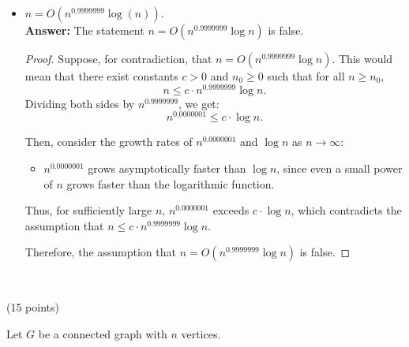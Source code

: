 \documentclass[12pt]{article}
\theoremstyle{plain}
\newcommand{\vs}{\vspace{2mm}}
\begin{document}
\begin{itemize}
    \item[(e)] $n = O(n^{0.9999999} \log (n))$. \\
        \textbf{Answer: } The statement \( n = O(n^{0.9999999} \log n) \) is false.
        \begin{proof}
            Suppose, for contradiction, that \( n = O(n^{0.9999999} \log n) \). This would mean that there exist constants \( c > 0 \) and \( n_0 \geq 0 \) such that for all \( n \geq n_0 \),
            \[ n \leq c \cdot n^{0.9999999} \log n. \]
            Dividing both sides by \( n^{0.9999999} \), we get:
            \[ n^{0.0000001} \leq c \cdot \log n. \]

            Then, consider the growth rates of \( n^{0.0000001} \) and \( \log n \) as \( n \to \infty \):
            \begin{itemize}
                \item[] \( n^{0.0000001} \) grows asymptotically faster than \( \log n \), since even a small power of \( n \) grows faster than the logarithmic function.
            \end{itemize}
            Thus, for sufficiently large \( n \), \( n^{0.0000001} \) exceeds \( c \cdot \log n \), which contradicts the assumption that \( n \leq c \cdot n^{0.9999999} \log n \). 
            
            Therefore, the assumption that \( n = O(n^{0.9999999} \log n) \) is false.
        \end{proof}
        \newpage
\end{itemize}
\vs\

(15 points) 
\vs\

Let $G$ be a connected graph with $n$ vertices.
\end{document}

